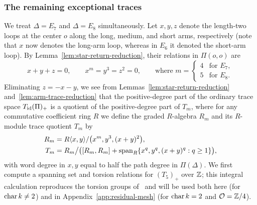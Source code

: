 \subsubsection{The remaining exceptional traces}

We treat $\Delta=E_7$ and $\Delta=E_8$ simultaneously. Let $x,y,z$ denote the length-two loops at the center $o$ along the long, medium, and short arms, respectively (note that $x$ now denotes the long-arm loop, whereas in $E_6$ it denoted the short-arm loop). By Lemma~\ref{lem:star-return-reduction}, their relations in $\Pi(o,o)$ are
\[
  x+y+z=0,\qquad x^m=y^3=z^2=0,\qquad
  \text{where }m=\begin{cases}4 & \text{for }E_7,\\ 5 & \text{for }E_8.\end{cases}
\]
Eliminating $z=-x-y$, we see from Lemmas~\ref{lem:star-return-reduction} and~\ref{lem:arm-trace-reduction} that the positive-degree part of the ordinary trace space $T_{\operatorname{id}}(\Pi)_+$ is a quotient of the positive-degree part of $T_m$, where for any commutative coefficient ring $R$ we define the graded $R$-algebra $R_m$ and its $R$-module trace quotient $T_m$ by
\begin{equation}
  \begin{split}
  R_m &= R\langle x,y\rangle/\bigl(x^m,y^3,(x+y)^2\bigr),\\
  T_m &= R_m\big/\bigl([R_m,R_m]+\operatorname{span}_R\{x^q,y^q,(x+y)^q:q\geq1\}\bigr),
  \end{split}
  \label{eq:exceptional-trace-spaces}
\end{equation}
with word degree in $x,y$ equal to half the path degree in $\Pi(\Delta)$. We first compute a spanning set and torsion relations for $(T_5)_+$ over $\mathbb Z$; this integral calculation reproduces the torsion groups of~\cite[Theorem~13.1.1]{Schedler} and will be used both here (for $\operatorname{char} k\ne2$) and in Appendix~\ref{app:residual-mesh} (for $\operatorname{char} k=2$ and $\mathcal O=\mathbb Z/4$).

